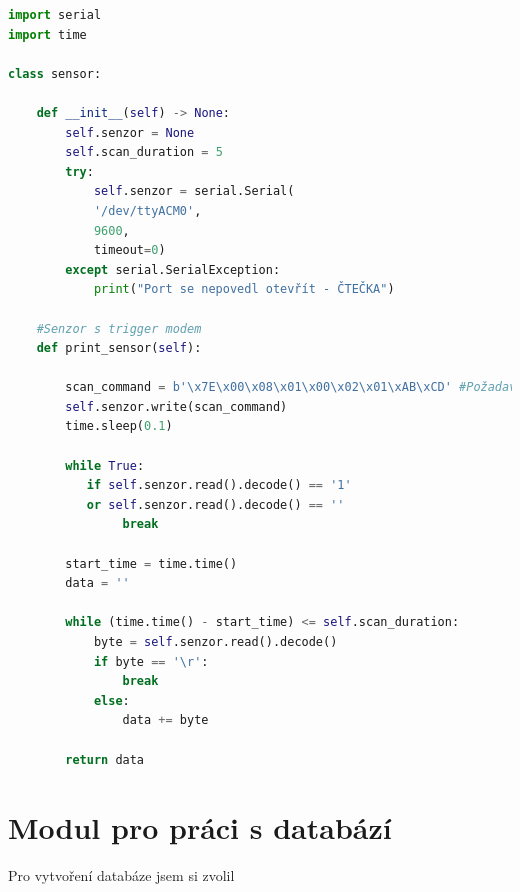 \begin{lstlisting}[language=Python, caption=Ukázka třídy pro čtečku čárového kódu, frame=single]
import serial
import time

class sensor:

    def __init__(self) -> None:
        self.senzor = None
        self.scan_duration = 5
        try:
            self.senzor = serial.Serial(
            '/dev/ttyACM0', 
            9600, 
            timeout=0)
        except serial.SerialException:
            print("Port se nepovedl otevřít - ČTEČKA")
    
    #Senzor s trigger modem
    def print_sensor(self):
        
        scan_command = b'\x7E\x00\x08\x01\x00\x02\x01\xAB\xCD' #Požadavek pro čtení    
        self.senzor.write(scan_command)
        time.sleep(0.1)

        while True:
           if self.senzor.read().decode() == '1' 
           or self.senzor.read().decode() == ''
                break

        start_time = time.time()
        data = ''

        while (time.time() - start_time) <= self.scan_duration:
            byte = self.senzor.read().decode()
            if byte == '\r':
                break
            else:
                data += byte

        return data
\end{lstlisting}

\section{Modul pro práci s databází}

Pro vytvoření databáze jsem si zvolil 

